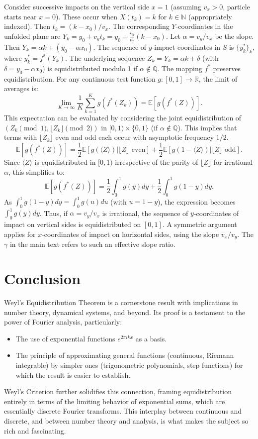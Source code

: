 \documentclass[12pt]{article}
\newcommand{\R}{\mathbb{R}}
\newcommand{\N}{\mathbb{N}}
\newcommand{\Q}{\mathbb{Q}}
\begin{document}
Consider successive impacts on the vertical side $x=1$ (assuming $v_x>0$, particle starts near $x=0$). These occur when $X(t_k)=k$ for $k \in \N$ (appropriately indexed). Then $t_k = (k-x_0)/v_x$.
The corresponding $Y$-coordinates in the unfolded plane are $Y_k = y_0 + v_y t_k = y_0 + \frac{v_y}{v_x}(k-x_0)$.
Let $\alpha = v_y/v_x$ be the slope. Then $Y_k = \alpha k + (y_0 - \alpha x_0)$.
The sequence of $y$-impact coordinates in $S$ is $\{y_k^*\}_{k}$, where $y_k^* = f^*(Y_k)$.
The underlying sequence $Z_k = Y_k = \alpha k + \delta$ (with $\delta = y_0 - \alpha x_0$) is equidistributed modulo 1 if $\alpha \notin \Q$.
The mapping $f^*$ preserves equidistribution. For any continuous test function $g:[0,1]\to\R$, the limit of averages is:
$$ \lim_{K\to\infty} \frac{1}{K} \sum_{k=1}^K g(f^*(Z_k)) = \mathbb{E}[g(f^*(Z))]. $$
This expectation can be evaluated by considering the joint equidistribution of $(Z_k \pmod 1, \lfloor Z_k \rfloor \pmod 2)$ in $[0,1) \times \{0,1\}$ (if $\alpha \notin\Q$). This implies that terms with $\lfloor Z_k \rfloor$ even and odd each occur with asymptotic frequency $1/2$.
$$ \mathbb{E}[g(f^*(Z))] = \frac{1}{2}\mathbb{E}[g(\langle Z \rangle) | \lfloor Z \rfloor \text{ even}] + \frac{1}{2}\mathbb{E}[g(1-\langle Z \rangle) | \lfloor Z \rfloor \text{ odd}]. $$
Since $\langle Z \rangle$ is equidistributed in $[0,1)$ irrespective of the parity of $\lfloor Z \rfloor$ for irrational $\alpha$, this simplifies to:
$$ \mathbb{E}[g(f^*(Z))] = \frac{1}{2}\int_0^1 g(y)dy + \frac{1}{2}\int_0^1 g(1-y)dy. $$
As $\int_0^1 g(1-y)dy = \int_0^1 g(u)du$ (with $u=1-y$), the expression becomes $\int_0^1 g(y)dy$.
Thus, if $\alpha=v_y/v_x$ is irrational, the sequence of $y$-coordinates of impact on vertical sides is equidistributed on $[0,1]$. A symmetric argument applies for $x$-coordinates of impact on horizontal sides, using the slope $v_x/v_y$. The $\gamma$ in the main text refers to such an effective slope ratio.


\section{Conclusion}

Weyl's Equidistribution Theorem is a cornerstone result with implications in number theory, dynamical systems, and beyond. Its proof is a testament to the power of Fourier analysis, particularly:
\begin{itemize}
    \item The use of exponential functions $e^{2\pi i k x}$ as a basis.
    \item The principle of approximating general functions (continuous, Riemann integrable) by simpler ones (trigonometric polynomials, step functions) for which the result is easier to establish.
\end{itemize}
Weyl's Criterion further solidifies this connection, framing equidistribution entirely in terms of the limiting behavior of exponential sums, which are essentially discrete Fourier transforms. This interplay between continuous and discrete, and between number theory and analysis, is what makes the subject so rich and fascinating.
\end{document}
